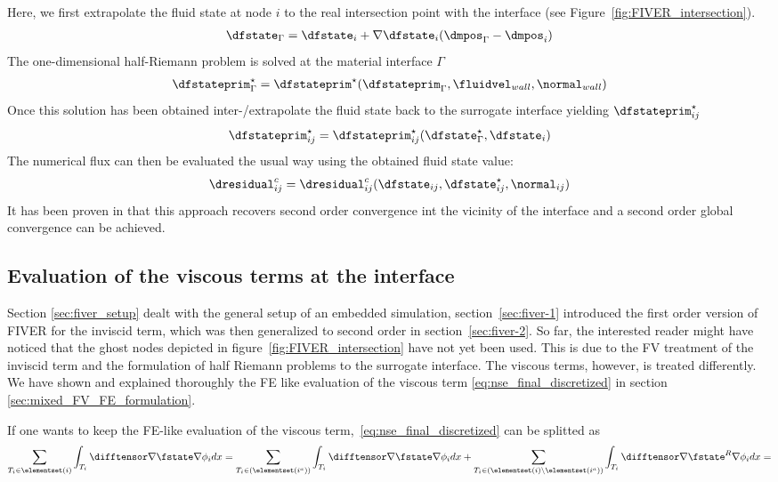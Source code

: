 \documentclass[../main.tex]{subfiles}
\begin{document}
Here, we first extrapolate the fluid state at node $i$ to the real intersection point with the interface (see Figure~\ref{fig:FIVER_intersection}).
\begin{align}
\dfstate_{\Gamma} = \dfstate_i + \nabla \dfstate_i(\dmpos_{\Gamma}-\dmpos_i)
\end{align}
The one-dimensional half-Riemann problem is solved at the material interface $\Gamma$
\begin{align}
\dfstateprim^{\star}_{\Gamma} = \dfstateprim^{\star}(\dfstateprim_\Gamma,\fluidvel_{wall},\normal_{wall})
\end{align}
Once this solution has been obtained inter-/extrapolate the fluid state back to the surrogate interface yielding $\dfstateprim^{\star}_{ij}$
\begin{align}
\dfstateprim^{\star}_{ij} = \dfstateprim^{\star}_{ij}(\dfstate^{\star}_\Gamma,\dfstate_i) 
\end{align}
The numerical flux can then be evaluated the usual way using the obtained fluid state value:
\begin{align}
\dresidual^c_{ij} = \dresidual^c_{ij}(\dfstate_{ij},\dfstate^{\star}_{ij}, \normal_{ij})
\end{align}
It has been proven in \cite{Main2014} that this approach recovers second order convergence int the vicinity of the interface and a second order global convergence can be achieved.


\subsection{Evaluation of the viscous terms at the interface}\label{sec:fiver_viscous_term}
Section \ref{sec:fiver_setup} dealt with the general setup of an embedded simulation, section~\ref{sec:fiver-1} introduced the first order version of \ac{FIVER} for the inviscid term, which was then generalized to second order in section~\ref{sec:fiver-2}. So far, the interested reader might have noticed that the ghost nodes depicted in figure~\ref{fig:FIVER_intersection} have not yet been used. This is due to the \ac{FV} treatment of the inviscid term and the formulation of half Riemann problems to the surrogate interface. The viscous terms, however, is treated differently.\\
We have shown and explained thoroughly the \ac{FE} like evaluation of the viscous term \eqref{eq:nse_final_discretized}  in section \ref{sec:mixed_FV_FE_formulation}.


If one wants to keep the \ac{FE}-like evaluation of the viscous term,~\eqref{eq:nse_final_discretized} can be splitted as
\begin{align}\label{eq:fiver_viscous_split}
\sum_{T_i \in \elementset(i)} \int_{T_i} \difftensor \nabla \fstate \nabla \phi_i dx=
\sum_{T_i \in \left(\elementset(i^a)\right)} \int_{T_i} \difftensor \nabla \fstate \nabla \phi_i dx+
\sum_{T_i \in \left(\elementset(i)\setminus\elementset(i^a)\right)} \int_{T_i} \difftensor \nabla \fstate^R \nabla \phi_i dx=
\end{align}
\end{document}
